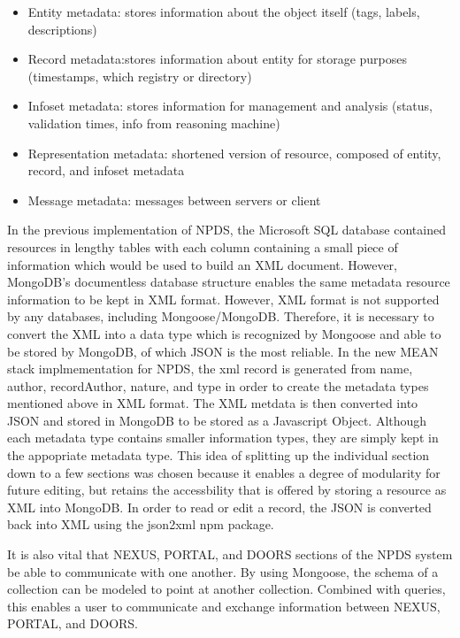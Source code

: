 \documentclass[10pt,twocolumn,twoside]{article}
\begin{document}
\begin{itemize}
  \item Entity metadata: stores information about the object itself (tags, labels, descriptions)
  \item Record metadata:stores information about entity for storage purposes (timestamps, which registry or directory)
  \item Infoset metadata: stores information for management and analysis (status, validation times, info from reasoning machine)
  \item Representation metadata: shortened version of resource, composed of entity, record, and infoset metadata
  \item Message metadata: messages between servers or client
\end{itemize}
	In the previous implementation of NPDS, the Microsoft SQL database contained resources in lengthy tables with each column containing a small piece of information which would be used to build an XML document. However, MongoDB's documentless database structure enables the same metadata resource information to be kept in XML format. However, XML format is not supported by any databases, including Mongoose/MongoDB. Therefore, it is necessary to convert the XML into a data type which is recognized by Mongoose and able to be stored by MongoDB, of which JSON is the most reliable. In the new MEAN stack implmementation for NPDS, the xml record is generated from name, author, recordAuthor, nature, and type in order to create the metadata types mentioned above in XML format. The XML metdata is then converted into JSON and stored in MongoDB to be stored as a Javascript Object. Although each metadata type contains smaller information types, they are simply kept in the appopriate metadata type. This idea of splitting up the individual section down to a few sections was chosen because it enables a degree of modularity for future editing, but retains the accessbility that is offered by storing a resource as XML into MongoDB. In order to read or edit a record, the JSON is converted back into XML using the json2xml npm package. 

	It is also vital that NEXUS, PORTAL, and DOORS sections of the NPDS system be able to communicate with one another. By using Mongoose, the schema of a collection can be modeled to point at another collection. Combined with queries, this enables a user to communicate and exchange information between NEXUS, PORTAL, and DOORS.  \newline
\end{document}

